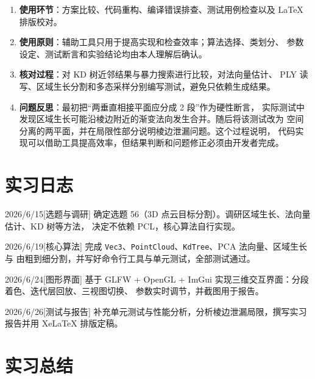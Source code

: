 \begin{enumerate}[label=(\arabic*)]
  \item \textbf{使用环节}：方案比较、代码重构、编译错误排查、测试用例检查以及
        \LaTeX{} 排版校对。
  \item \textbf{使用原则}：辅助工具只用于提高实现和检查效率；算法选择、类划分、
        参数设定、测试断言和实验结论均由本人理解后确认。
  \item \textbf{核对过程}：对 KD 树近邻结果与暴力搜索进行比较，对法向量估计、
        PLY 读写、区域生长分割和多态采样分别编写测试，避免只依赖生成结果。
  \item \textbf{问题反思}：最初把“两垂直相接平面应分成 2 段”作为硬性断言，
        实际测试中发现区域生长可能沿棱边附近的渐变法向发生合并。随后将该测试改为
        空间分离的两平面，并在局限性部分说明棱边泄漏问题。这个过程说明，
        代码实现可以借助工具提高效率，但结果判断和问题修正必须由开发者完成。
\end{enumerate}

\section{实习日志}

\begin{internlog}{2026/6/15}[选题与调研]
  确定选题 56（3D 点云目标分割）。调研区域生长、法向量估计、KD 树等方法，
  决定不依赖 PCL，核心算法自行实现。
\end{internlog}

\begin{internlog}{2026/6/19}[核心算法]
  完成 \texttt{Vec3}、\texttt{PointCloud}、\texttt{KdTree}、PCA 法向量、区域生长与
  由粗到细分割，并写好命令行工具与单元测试，全部测试通过。
\end{internlog}

\begin{internlog}{2026/6/24}[图形界面]
  基于 GLFW + OpenGL + ImGui 实现三维交互界面：分段着色、迭代层回放、三视图切换、
  参数实时调节，并截图用于报告。
\end{internlog}

\begin{internlog}{2026/6/26}[测试与报告]
  补充单元测试与性能分析，分析棱边泄漏局限，撰写实习报告并用 Xe\LaTeX{} 排版定稿。
\end{internlog}

\section{实习总结}

